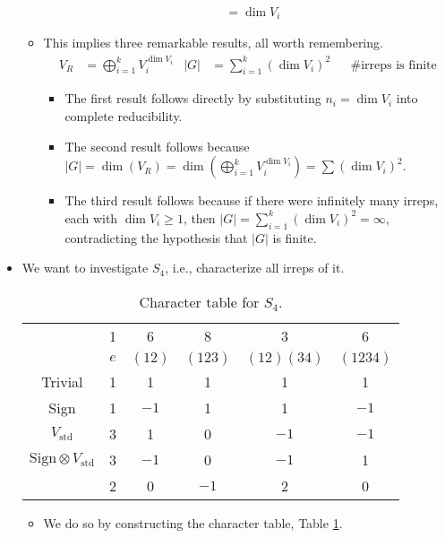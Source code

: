 \documentclass[../notes.tex]{subfiles}
\begin{document}
\begin{itemize}
\begin{itemize}
\begin{align*}
            &= \dim V_i
        \end{align*}
        \item This implies three remarkable results, all worth remembering.
        \begin{align*}
            V_R &= \bigoplus_{i=1}^kV_i^{\dim V_i}&
            |G| &= \sum_{i=1}^k(\dim V_i)^2&
            &\text{\# irreps is finite}
        \end{align*}
        \begin{itemize}
            \item The first result follows directly by substituting $n_i=\dim V_i$ into complete reducibility.
            \item The second result follows because $|G|=\dim(V_R)=\dim(\bigoplus_{i=1}^kV_i^{\dim V_i})=\sum(\dim V_i)^2$.
            \item The third result follows because if there were infinitely many irreps, each with $\dim V_i\geq 1$, then $|G|=\sum_{i=1}^k(\dim V_i)^2=\infty$, contradicting the hypothesis that $|G|$ is finite.
        \end{itemize}
    \end{itemize}
    \item We want to investigate $S_4$, i.e., characterize all irreps of it.
    \begin{table}[h!]
        \centering
        \small
        \renewcommand{\arraystretch}{1.2}
        \begin{tabular}{c|c|c|c|c|c|}
             & 1 & 6 & 8 & 3 & 6\\
             & $e$ & $(12)$ & $(123)$ & $(12)(34)$ & $(1234)$\\ \hline
            Trivial & 1 & 1 & 1 & 1 & 1\\ \hline
            Sign & 1 & $-1$ & 1 & 1 & $-1$\\ \hline
            $V_\text{std}$ & 3 & 1 & 0 & $-1$ & $-1$\\ \hline
            $\text{Sign}\otimes V_\text{std}$ & 3 & $-1$ & 0 & $-1$ & 1\\ \hline
             & 2 & 0 & $-1$ & 2 & 0\\
        \end{tabular}
        \caption{Character table for $S_4$.}
        \label{tab:charTableS4}
    \end{table}
    \begin{itemize}
        \item We do so by constructing the character table, Table \ref{tab:charTableS4}.

\end{itemize}
\end{itemize}
\end{document}

